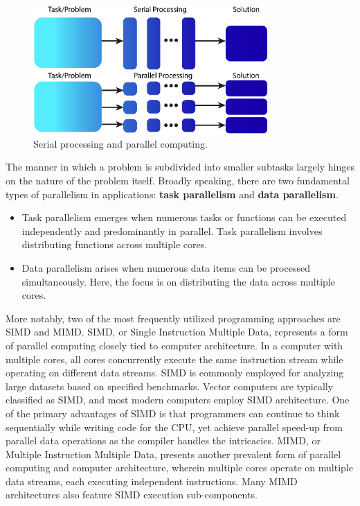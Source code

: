 \begin{figure}[!h]
\centering\includegraphics[width=0.8\textwidth]{fig_logo_history/comput_serial_parallel.png}
\caption{Serial processing and parallel computing.}\label{fig:comput_serial_parallel}
\end{figure}


\par

The manner in which a problem is subdivided into smaller subtasks largely hinges on the nature of the problem itself. Broadly speaking, there are two fundamental types of parallelism in applications: \textbf{task parallelism} and \textbf{data parallelism}.
\begin{itemize}
\item Task parallelism emerges when numerous tasks or functions can be executed independently and predominantly in parallel. Task parallelism involves distributing functions across multiple cores.
\item Data parallelism arises when numerous data items can be processed simultaneously. Here, the focus is on distributing the data across multiple cores.
\end{itemize}


\par
More notably, two of the most frequently utilized programming approaches are SIMD and MIMD.
SIMD, or Single Instruction Multiple Data, represents a form of parallel computing closely tied to computer architecture. In a computer with multiple cores, all cores concurrently execute the same instruction stream while operating on different data streams. SIMD is commonly employed for analyzing large datasets based on specified benchmarks. Vector computers are typically classified as SIMD, and most modern computers employ SIMD architecture. One of the primary advantages of SIMD is that programmers can continue to think sequentially while writing code for the CPU, yet achieve parallel speed-up from parallel data operations as the compiler handles the intricacies.
MIMD, or Multiple Instruction Multiple Data, presents another prevalent form of parallel computing and computer architecture, wherein multiple cores operate on multiple data streams, each executing independent instructions. Many MIMD architectures also feature SIMD execution sub-components.

